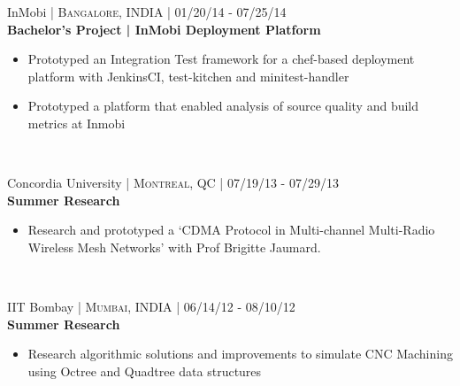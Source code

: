 \documentclass[10pt]{article} %
\begin{document}
{\begin{minipage}[t]{0.57\textwidth}


{\raggedright\large InMobi \normalsize\textsc{ | Bangalore, INDIA} | 01/20/14 - 07/25/14\\
\textbf{Bachelor's Project | InMobi Deployment Platform }\\[5pt]}
\vspace{0pt}
\begin{itemize}\itemsep-0.25em
    \item Prototyped an Integration Test framework for a chef-based deployment platform with JenkinsCI, test-kitchen and minitest-handler
    \item Prototyped a platform that enabled analysis of source quality and build metrics at Inmobi
\end{itemize}\\



{\raggedright\large Concordia University \normalsize\textsc{ | Montreal, QC | 07/19/13 - 07/29/13}\\
\textbf{Summer Research}\\[5pt]}
\begin{itemize}\itemsep-0.25em
    \item Research and prototyped a ‘CDMA Protocol in Multi-channel Multi-Radio Wireless Mesh Networks’ with Prof Brigitte Jaumard.
\end{itemize}\\



{\raggedright\large IIT Bombay \normalsize\textsc{ | Mumbai, INDIA | 06/14/12 - 08/10/12}\\
\textbf{Summer Research}\\[5pt]}
\begin{itemize}\itemsep-0.25em
    \item Research algorithmic solutions and improvements  to simulate CNC Machining using Octree and Quadtree data structures
\end{itemize}\\


\end{minipage}}
\end{document}
